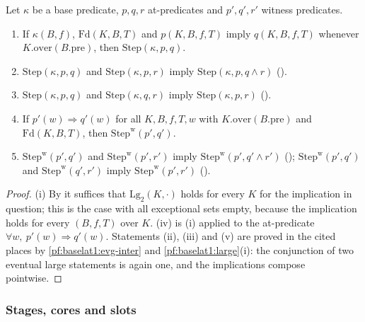 \begin{lemma}\label{pf:baselat1:stepcalc}
Let $\kappa$ be a base predicate, $p,q,r$ at-predicates and $p',q',r'$ witness predicates.
\begin{enumerate}[label=(\roman*)]
\item If $\kappa(B,f)$, $\mathrm{Fd}(K,B,T)$ and $p(K,B,f,T)$ imply $q(K,B,f,T)$ whenever
  $K.\mathrm{over}(B.\mathrm{pre})$, then $\mathrm{Step}(\kappa,p,q)$.
\item $\mathrm{Step}(\kappa,p,q)$ and $\mathrm{Step}(\kappa,p,r)$ imply $\mathrm{Step}(\kappa,p,q\wedge r)$
  \textup{()}.
\item $\mathrm{Step}(\kappa,p,q)$ and $\mathrm{Step}(\kappa,q,r)$ imply $\mathrm{Step}(\kappa,p,r)$
  \textup{()}.
\item If $p'(w)\Rightarrow q'(w)$ for all $K,B,f,T,w$ with $K.\mathrm{over}(B.\mathrm{pre})$ and
  $\mathrm{Fd}(K,B,T)$, then $\mathrm{Step}^{\mathrm w}(p',q')$.
\item $\mathrm{Step}^{\mathrm w}(p',q')$ and $\mathrm{Step}^{\mathrm w}(p',r')$ imply $\mathrm{Step}^{\mathrm w}(p',q'\wedge r')$
  \textup{()}; $\mathrm{Step}^{\mathrm w}(p',q')$ and
  $\mathrm{Step}^{\mathrm w}(q',r')$ imply $\mathrm{Step}^{\mathrm w}(p',r')$ \textup{()}.
\end{enumerate}
\end{lemma}

\begin{proof}
(i) By  it suffices that
$\mathrm{Lg}_2(K,\cdot)$ holds for every $K$ for the implication in question; this is the case with all
exceptional sets empty, because the implication holds for every $(B,f,T)$ over $K$. (iv) is (i) applied to
the at-predicate $\forall w,\ p'(w)\Rightarrow q'(w)$. Statements (ii), (iii) and (v) are proved in the cited
places by \cref{pf:baselat1:evg-inter} and \cref{pf:baselat1:large}(i): the conjunction of two eventual
large statements is again one, and the implications compose pointwise.
\end{proof}

\subsubsection{Stages, cores and slots}\label{pf:baselat1:defs}

